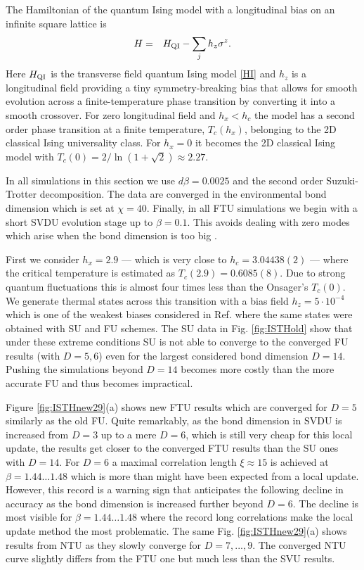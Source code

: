 \documentclass[prb,twocolumn,showkeys,showpacs,amsmath,amsfonts,floatfix,superscriptaddress,nofootinbib]{revtex4-1}
\def\bea{\begin{eqnarray}}
\def\eea{\end{eqnarray}}
\begin{document}
The Hamiltonian of the quantum Ising model with a longitudinal bias on an infinite square lattice is
\bea 
H&=&
H_{\rm QI} -\sum_j h_z \sigma^z .
\label{HIbias}
\eea
Here $H_{\rm QI}$ is the transverse field quantum Ising model \eqref{HI} and $h_z$ is a longitudinal field providing
a tiny symmetry-breaking bias that allows for smooth evolution across a finite-temperature phase transition
by converting it into a smooth crossover. For zero longitudinal field and $h_x < h_c$ the model has a second order phase transition at a finite temperature, $T_c(h_x)$, belonging to the 2D classical Ising universality class. For $h_x=0$ it becomes the 2D classical Ising model with $T_c(0)=2/\ln(1+\sqrt{2})\approx 2.27$. 

In all simulations in this section we use $d\beta=0.0025$ and the second order Suzuki-Trotter decomposition. The data are converged in the environmental bond dimension which is set at $\chi=40$. Finally, in all FTU simulations we begin with a short SVDU evolution stage up to $\beta=0.1$. This avoids dealing with zero modes which arise when the bond dimension is too big \cite{CzarnikSS}.

First we consider $h_x=2.9$ --- which is very close to $h_c=3.04438(2)$\cite{Deng_QIshc_02} --- where the critical temperature is estimated as $T_c(2.9)=0.6085(8)$\cite{Hesselmann_TIsingQMC_16}. Due to strong quantum fluctuations this is almost four times less than the Onsager's $T_c(0)$. We generate thermal states across this transition with a bias field $h_z=5\cdot10^{-4}$ which is one of the weakest biases considered in Ref.  where the same states were obtained with SU and FU schemes. The SU data\cite{CzarnikDziarmagaCorboz} in Fig. \ref{fig:ISTHold} show that under these extreme conditions SU is not able to converge to the converged FU results (with $D=5,6$) even for the largest considered bond dimension $D=14$. Pushing the simulations beyond $D=14$ becomes more costly than the more accurate FU and thus becomes impractical\cite{CzarnikDziarmagaCorboz}. 

Figure \ref{fig:ISTHnew29}(a) shows new FTU results which are converged for $D=5$ similarly as the old FU. Quite remarkably, as the bond dimension in SVDU is increased from $D=3$ up to a mere $D=6$, which is still very cheap for this local update, the results get closer to the converged FTU results than the SU ones with $D=14$. For $D=6$ a maximal correlation length $\xi\approx15$ is achieved at $\beta=1.44\dots1.48$ which is more than might have been expected from a local update. However, this record is a warning sign that anticipates the following decline in accuracy as the bond dimension is increased further beyond $D=6$. The decline is most visible for $\beta=1.44\dots1.48$ where the record long correlations make the local update method the most problematic. The same Fig. \ref{fig:ISTHnew29}(a) shows results from NTU as they slowly converge for $D=7,...,9$. The converged NTU curve slightly differs from the FTU one but much less than the SVU results.
\end{document}
